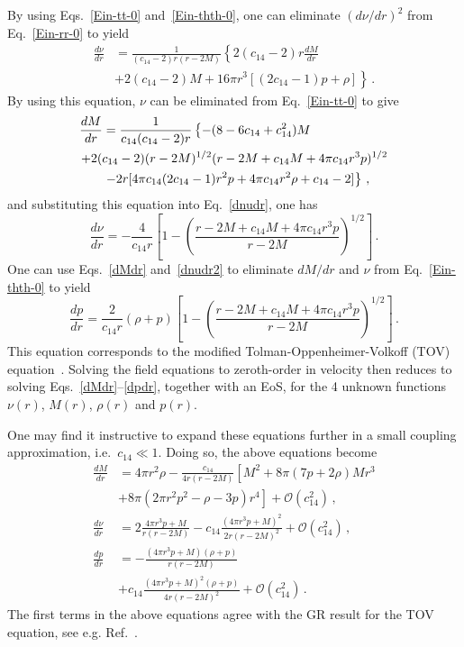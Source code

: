 \documentclass[prd,aps,twocolumn,nofootinbib,showpacs,superscriptaddress]{revtex4-1}
\newcommand\be{\begin{equation}}
\newcommand\ee{\end{equation}}
\newcommand{\nn}{\nonumber}
\begin{document}
By using Eqs.~\eqref{Ein-tt-0} and~\eqref{Ein-thth-0}, one can
eliminate $(d\nu/dr)^2$ from Eq.~\eqref{Ein-rr-0} to yield
%
\begin{align}
\label{dnudr}
\frac{d\nu}{dr} &= \frac{1}{(c_{14}-2) r (r-2M)} \left\{ 2 (c_{14}-2)
r \frac{dM}{dr} \right.  \nn \\ &+ \left.  2(c_{14} -2) M+16 \pi r^3
[(2 c_{14}-1) p+ \rho ] \right\}\,.
\end{align}
%
By using this equation, $\nu$ can be eliminated from
Eq.~\eqref{Ein-tt-0} to give
%
\begin{align}
\label{dMdr}
\frac{dM}{dr} &= \frac{1}{ c_{14} (c_{14}-2) r} \left\{- (8-6 c_{14}+c_{14}^2) M   \right.  \nn \\ &\hspace{-.7cm}\left.  + 2 (c_{14}-2)
(r-2 M)^{1/2}  (r -2 M+c_{14} M+4 \pi
c_{14} r^3 p)^{1/2}  \right.  \nn \\ &
\left.  - 2r [4 \pi c_{14} (2 c_{14}-1) r^2  p+4 \pi c_{14} r^2  \rho
  + c_{14}-2] \right\}\,,
\end{align}
%
and substituting this equation into Eq.~\eqref{dnudr}, one has
%
\be
\label{dnudr2}
\frac{d\nu}{dr} =- \frac{4}{c_{14} r}\left[1- \left(\frac{r-2 M+c_{14}
    M+4 \pi c_{14}  r^3 p}{r-2M}\right)^{1/2}\right]\,.  \ee
%
One can use Eqs.~\eqref{dMdr} and~\eqref{dnudr2} to eliminate $dM/dr$
and $\nu$ from Eq.~\eqref{Ein-thth-0} to yield
%
\be
\label{dpdr}
\frac{dp}{dr} = \frac{2}{c_{14}r} (\rho +p) \left[1 -
  \left(\frac{r-2M+c_{14} M+4 \pi c_{14} r^3 p}{r-2M}
  \right)^{1/2}\right]\,.  \ee
%
This equation corresponds to the modified Tolman-Oppenheimer-Volkoff
(TOV) equation~\cite{Oppenheimer:1939ne,Tolman:1939jz}. Solving the field equations to zeroth-order in
velocity then reduces to solving Eqs.~\eqref{dMdr}--\eqref{dpdr},
together with an EoS, for the 4 unknown functions $\nu(r)$, $M(r)$,
$\rho(r)$ and $p(r)$. 

One may find it instructive to expand these equations further in a
small coupling approximation, i.e.~$c_{14} \ll 1$. Doing so, the above
equations become
%
\begin{align}
\frac{dM}{dr} &= 4 \pi r^2 \rho - \frac{c_{14}}{4r (r-2M)} \left[M^2 +
  8 \pi (7 p+ 2\rho ) M r^3  \right.  \nn \\ &\left.  + 8 \pi (2\pi
  r^2 p^2- \rho-3 p) r^4\right] + \mathcal{O}(c_{14}^2)\,,
\\ \frac{d\nu}{dr} &= 2\frac{4 \pi r^3 p +M}{r (r-2M)}- c_{14}
\frac{(4 \pi r^3 p +M)^2}{2r (r-2M)^2 } + \mathcal{O}(c_{14}^2)\,,
\\ \frac{dp}{dr} &= -\frac{(4\pi r^3 p +M) (\rho +p)}{r (r-2M)} \nn
\\ &+ c_{14}\frac{(4 \pi r^3 p +M)^2 (\rho + p)}{4r(r-2M)^2} +
\mathcal{O}(c_{14}^2)\,.
\end{align}
% 
The first terms in the above equations agree with the GR result for the TOV equation, see
e.g. Ref.~\cite{Oppenheimer:1939ne,Tolman:1939jz}.
\end{document}
